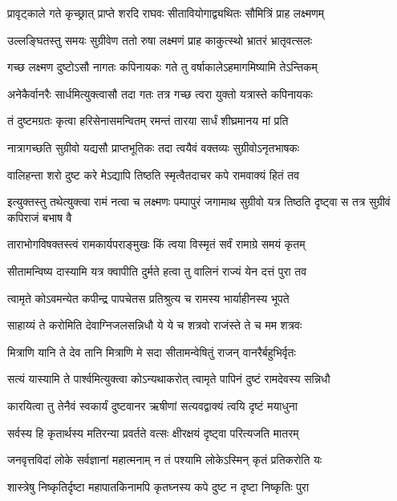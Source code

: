 \twolineshloka
{प्रावृट्काले गते कृच्छ्रात् प्राप्ते शरदि राघवः}
{सीतावियोगाद्व्यथितः सौमित्रिं प्राह लक्ष्मणम्} %

\twolineshloka
{उल्लङ्घितस्तु समयः सुग्रीवेण ततो रुषा}
{लक्ष्मणं प्राह काकुत्स्थो भ्रातरं भ्रातृवत्सलः} %

\twolineshloka
{गच्छ लक्ष्मण दुष्टोऽसौ नागतः कपिनायकः}
{गते तु वर्षाकालेऽहमागमिष्यामि तेऽन्तिकम्} %

\twolineshloka
{अनेकैर्वानरैः सार्धमित्युक्त्वासौ तदा गतः}
{तत्र गच्छ त्वरा युक्तो यत्रास्ते कपिनायकः} %

\twolineshloka
{तं दुष्टमग्रतः कृत्वा हरिसेनासमन्वितम्}
{रमन्तं तारया सार्धं शीघ्रमानय मां प्रति} %

\twolineshloka
{नात्रागच्छति सुग्रीवो यद्यसौ प्राप्तभूतिकः}
{तदा त्वयैवं वक्तव्यः सुग्रीवोऽनृतभाषकः} %

\twolineshloka
{वालिहन्ता शरो दुष्ट करे मेऽद्यापि तिष्ठति}
{स्मृत्वैतदाचर कपे रामवाक्यं हितं तव} %

\threelineshloka
{इत्युक्तस्तु तथेत्युक्त्वा रामं नत्वा च लक्ष्मणः}
{पम्पापुरं जगामाथ सुग्रीवो यत्र तिष्ठति}
{दृष्ट्वा स तत्र सुग्रीवं कपिराजं बभाष वै} %

\twolineshloka
{ताराभोगविषक्तस्त्वं रामकार्यपराङ्मुखः}
{किं त्वया विस्मृतं सर्वं रामाग्रे समयं कृतम्} %

\twolineshloka
{सीतामन्विष्य दास्यामि यत्र क्वापीति दुर्मते}
{हत्वा तु वालिनं राज्यं येन दत्तं पुरा तव} %

\twolineshloka
{त्वामृते कोऽवमन्येत कपीन्द्र पापचेतस}
{प्रतिश्रुत्य च रामस्य भार्याहीनस्य भूपते} %

\twolineshloka
{साहाय्यं ते करोमिति देवाग्निजलसन्निधौ}
{ये ये च शत्रवो राजंस्ते ते च मम शत्रवः} %

\twolineshloka
{मित्राणि यानि ते देव तानि मित्राणि मे सदा}
{सीतामन्वेषितुं राजन् वानरैर्बहुभिर्वृतः} %

\twolineshloka
{सत्यं यास्यामि ते पार्श्वमित्युक्त्वा कोऽन्यथाकरोत्}
{त्वामृते पापिनं दुष्टं रामदेवस्य सन्निधौ} %

\twolineshloka
{कारयित्वा तु तेनैवं स्वकार्यं दुष्टवानर}
{ऋषीणां सत्यवद्वाक्यं त्वयि दृष्टं मयाधुना} %

\twolineshloka
{सर्वस्य हि कृतार्थस्य मतिरन्या प्रवर्तते}
{वत्सः क्षीरक्षयं दृष्ट्वा परित्यजति मातरम्} %

\twolineshloka
{जनवृत्तविदां लोके सर्वज्ञानां महात्मनाम्}
{न तं पश्यामि लोकेऽस्मिन् कृतं प्रतिकरोति यः} %

\twolineshloka
{शास्त्रेषु निष्कृतिर्दृष्टा महापातकिनामपि}
{कृतघ्नस्य कपे दुष्ट न दृष्टा निष्कृतिः पुरा} %

